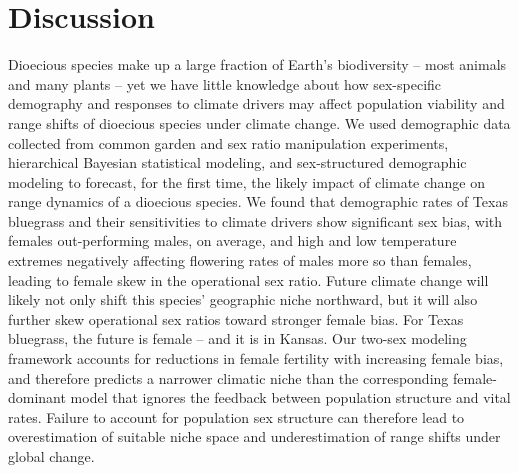 \documentclass[9pt,twocolumn,twoside,lineno]{pnas-new}
\begin{document}
\section*{Discussion}
Dioecious species make up a large fraction of Earth's biodiversity -- most animals and many plants -- yet we have little knowledge about how sex-specific demography and responses to climate drivers may affect population viability and range shifts of dioecious species under climate change.
We used demographic data collected from common garden and sex ratio manipulation experiments, hierarchical Bayesian statistical modeling, and sex-structured demographic modeling to forecast, for the first time, the likely impact of climate change on range dynamics of a dioecious species.
We found that demographic rates of Texas bluegrass and their sensitivities to climate drivers show significant sex bias, with females out-performing males, on average, and high and low temperature extremes negatively affecting flowering rates of males more so than females, leading to female skew in the operational sex ratio. 
Future climate change will likely not only shift this species' geographic niche northward, but it will also further skew operational sex ratios toward stronger female bias. 
For Texas bluegrass, the future is female -- and it is in Kansas. 
Our two-sex modeling framework accounts for reductions in female fertility with increasing female bias, and therefore predicts a narrower climatic niche than the corresponding female-dominant model that ignores the feedback between population structure and vital rates. 
Failure to account for population sex structure can therefore lead to overestimation of suitable niche space and underestimation of range shifts under global change. 
\end{document}
